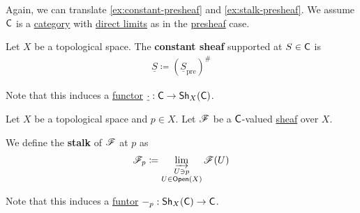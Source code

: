 \documentclass[../../../main]{subfiles}
\begin{document}
Again, we can translate \autoref{ex:constant-presheaf} and \autoref{ex:stalk-presheaf}.
We assume \(\mathsf{C}\) is a \hyperref[def:category]{category} with \hyperref[def:direct-limit]{direct limits} as in the \hyperref[def:presheaf]{presheaf} case.
\begin{definition} \label{def:constant-sheaf}
  Let \(X\) be a topological space.
  The \textbf{constant sheaf} supported at \(S \in \mathsf{C}\) is
  \begin{align*}
    \underline{S} \coloneq \left( \underline{S}_{\operatorname{pre}} \right)^{\#}
  \end{align*}

  Note that this induces a \hyperref[def:functor]{functor} \(\underline{\cdot}: \mathsf{C} \to \mathsf{Sh}_{X}(\mathsf{C})\).
\end{definition}

\begin{definition}[Stalk] \label{def:stalk-sheaf}
  Let \(X\) be a topological space and \(p \in X\).
  Let \(\mathscr{F}\) be a \(\mathsf{C}\)-valued \hyperref[def:sheaf]{sheaf} over \(X\).

  We define the \textbf{stalk} of \(\mathscr{F}\) at \(p\) as
  \begin{align*}
    \mathscr{F}_{p} \coloneq \varinjlim_{\substack{U \ni p \\ U \in \mathsf{Open}(X)}} \mathscr{F}(U)
  \end{align*}

  Note that this induces a \hyperref[def:functor]{funtor} \(-_{p}: \mathsf{Sh}_{X}(\mathsf{C}) \to \mathsf{C}\).
\end{definition}
\end{document}
